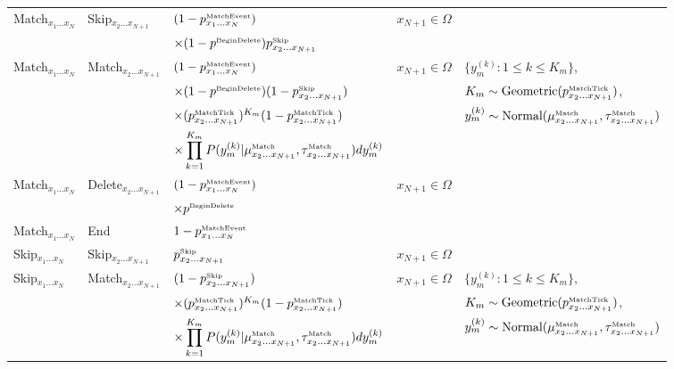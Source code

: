 \documentclass[10pt]{article}
\begin{document}
\begin{tabular}{lllll}
Match${}_{x_1 \ldots x_N}$ & Skip${}_{x_2 \ldots x_{N+1}}$ & $(1 - {p^{\mbox{\tiny MatchEvent}}_{x_1\ldots x_N}})$ & $x_{N+1} \in \Omega$ & \\
& & $\times (1 - p^{\mbox{\tiny BeginDelete}}) p^{\mbox{\tiny Skip}}_{x_2\ldots x_{N+1}}$ & & \\
Match${}_{x_1 \ldots x_N}$ & Match${}_{x_2 \ldots x_{N+1}}$ & $(1 - {p^{\mbox{\tiny MatchEvent}}_{x_1\ldots x_N}})$ & $x_{N+1} \in \Omega$ & $\{ y_m^{(k)}: 1 \leq k \leq K_m \}$, \\
& & $\times (1 - p^{\mbox{\tiny BeginDelete}}) (1 - p^{\mbox{\tiny Skip}}_{x_2\ldots x_{N+1}})$ & & $K_m \sim \mbox{Geometric}(p^{\mbox{\tiny MatchTick}}_{x_2\ldots x_{N+1}})$, \\
& & $\times (p^{\mbox{\tiny MatchTick}}_{x_2\ldots x_{N+1}})^{K_m} (1-p^{\mbox{\tiny MatchTick}}_{x_2\ldots x_{N+1}})$ & & $y_m^{(k)} \sim \mbox{Normal}(\mu^{\mbox{\tiny Match}}_{x_2\ldots x_{N+1}},\tau^{\mbox{\tiny Match}}_{x_2\ldots x_{N+1}})$ \\
& & $\times \displaystyle \prod_{k=1}^{K_m} P(y^{(k)}_m|\mu^{\mbox{\tiny Match}}_{x_2\ldots x_{N+1}},\tau^{\mbox{\tiny Match}}_{x_2\ldots x_{N+1}}) dy^{(k)}_m$ \\
Match${}_{x_1 \ldots x_N}$ & Delete${}_{x_2 \ldots x_{N+1}}$ & $(1 - {p^{\mbox{\tiny MatchEvent}}_{x_1\ldots x_N}})$ & $x_{N+1} \in \Omega$ & \\
& & $\times p^{\mbox{\tiny BeginDelete}}$ & & \\
Match${}_{x_1 \ldots x_N}$ & End & $1 - {p^{\mbox{\tiny MatchEvent}}_{x_1\ldots x_N}}$ & & \\
Skip${}_{x_1 \ldots x_N}$ & Skip${}_{x_2 \ldots x_{N+1}}$ & $p^{\mbox{\tiny Skip}}_{x_2\ldots x_{N+1}}$ & $x_{N+1} \in \Omega$ & \\
Skip${}_{x_1 \ldots x_N}$ & Match${}_{x_2 \ldots x_{N+1}}$ & $(1 - p^{\mbox{\tiny Skip}}_{x_2\ldots x_{N+1}})$ & $x_{N+1} \in \Omega$ & $\{ y_m^{(k)}: 1 \leq k \leq K_m \}$, \\
& & $\times (p^{\mbox{\tiny MatchTick}}_{x_2\ldots x_{N+1}})^{K_m} (1-p^{\mbox{\tiny MatchTick}}_{x_2\ldots x_{N+1}})$ & & $K_m \sim \mbox{Geometric}(p^{\mbox{\tiny MatchTick}}_{x_2\ldots x_{N+1}})$, \\
& & $\times \displaystyle \prod_{k=1}^{K_m} P(y^{(k)}_m|\mu^{\mbox{\tiny Match}}_{x_2\ldots x_{N+1}},\tau^{\mbox{\tiny Match}}_{x_2\ldots x_{N+1}}) dy^{(k)}_m$ & & $y_m^{(k)} \sim \mbox{Normal}(\mu^{\mbox{\tiny Match}}_{x_2\ldots x_{N+1}},\tau^{\mbox{\tiny Match}}_{x_2\ldots x_{N+1}})$ \\

\end{tabular}
\end{document}
